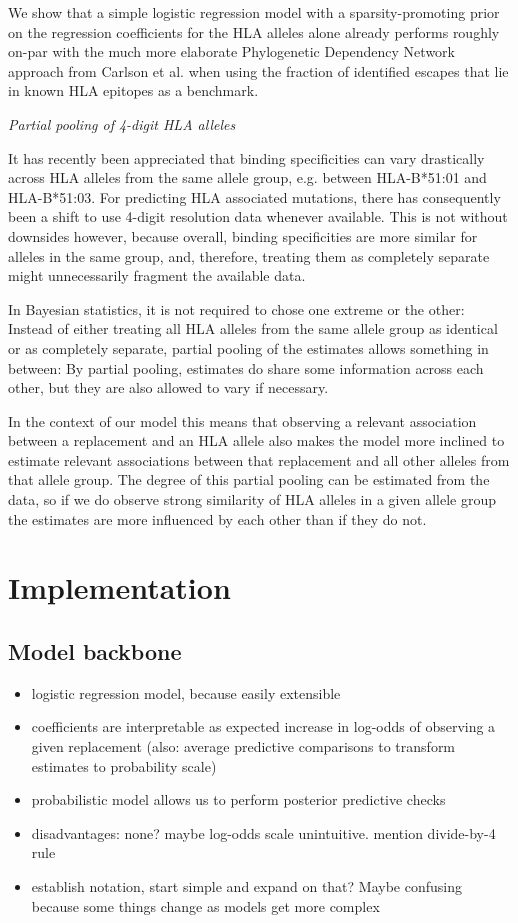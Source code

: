 \documentclass[fleqn,11pt]{SelfArx} %
\begin{document}
  We show that a simple logistic regression model with a sparsity-promoting prior on the regression coefficients for the HLA alleles alone already performs roughly on-par  with the much more elaborate Phylogenetic Dependency Network approach from Carlson et al. when using the fraction of identified escapes that lie in known HLA epitopes as a benchmark.

  \textit{Partial pooling of 4-digit HLA alleles}
  
  It has recently been appreciated that binding specificities can vary drastically across  HLA alleles from the same allele group, e.g. between HLA-B*51:01 and HLA-B*51:03. For predicting HLA associated mutations, there has consequently been a shift to use 4-digit resolution data whenever available. This is not without downsides however, because overall, binding specificities are more similar for alleles in the same group, and, therefore, treating them as completely separate might unnecessarily fragment the available data.

  In Bayesian statistics, it is not required to chose one extreme or the other: Instead of either treating all HLA alleles from the same allele group as identical or as completely separate, partial pooling of the estimates allows something in between: By partial pooling, estimates do share some information across each other, but they are also allowed to vary if necessary.

  In the context of our model this means that observing a relevant association between a replacement and an HLA allele also makes the model more inclined to estimate relevant associations between that replacement and all other alleles from that allele group. The degree of this partial pooling can be estimated from the data, so if we do observe strong similarity of HLA alleles in a given allele group the estimates are more influenced by each other than if they do not.

\section{Implementation}

\subsection*{Model backbone}
\begin{itemize}
  \item logistic regression model, because easily extensible
  \item coefficients are interpretable as expected increase in log-odds of observing  a given replacement (also: average predictive comparisons to transform estimates to probability scale)
  \item probabilistic model allows us to perform posterior predictive checks
  \item disadvantages: none? maybe log-odds scale unintuitive. mention divide-by-4 rule
  \item  establish notation, start simple and expand on that? Maybe confusing because some things change as models get more complex 
\end{itemize}
\end{document}

